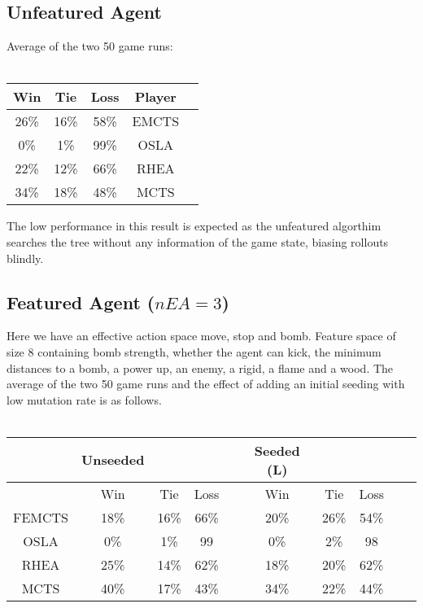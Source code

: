 \documentclass{llncs}
\begin{document}
\subsection{Unfeatured Agent}

Average of the two 50 game runs:
\\ \\
\begin{center}
\begin{tabular}{ |c|c|c|c|c| } 
 \hline
  	     Win &	Tie & Loss & Player \\ 
  	     \hline
  	26\%	&16\%	&58\% & EMCTS  \\
    0\% &	1\%	&99\% & OSLA \\
    22\% &	12\%	&66\% & RHEA  \\
  	34\%	& 18\%	&48\% & MCTS  \\
 \hline
\end{tabular}
\label{sophisticatedtable}
\end{center} 
 \vspace{2mm}
 
 \noindent
 The low performance in this result is expected as the unfeatured algorthim searches the tree without any information of the game state, biasing rollouts blindly.
 


\subsection{Featured Agent ($nEA = 3$)}

Here we have an effective action space move, stop and bomb. Feature space of size 8 containing bomb strength, whether the agent can kick,  the minimum distances to a bomb, a power up, an enemy, a rigid, a flame and a wood. The average of the two 50 game runs and the effect of adding an initial seeding with low mutation rate is as follows. 
\\ \\
\begin{center}
\begin{tabular}{ |c|c|c|c|c|c|c|c|c|c| } 
 \hline
 & Unseeded  & & & & Seeded (L)& &\\
 \hline
  	 & Win &	Tie & Loss & & Win &	Tie & Loss \\ 
  	 \hline
  FEMCTS	&18\%	&16\%	&66\% & 	&20\%	&26\%	&54\% \\
  OSLA &0\% &	1\%	&99 &  &0\% &	2\%	&98 \\
  RHEA &25\% &	14\%	&62\% &  &18\% &	20\%	&62\% \\
  MCTS&40\%	& 17\%	&43\% & &34\%	& 22\%	&44\% \\
 \hline
\end{tabular}
\label{sophisticatedtable}
\end{center} 
\end{document}
